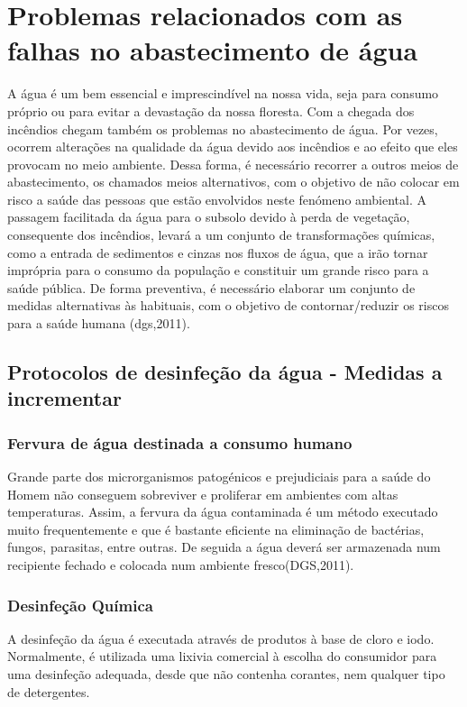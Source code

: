\documentclass{report}
\begin{document}
\section{Problemas relacionados com as falhas no abastecimento de água}
A água é um bem essencial e imprescindível na nossa vida, seja para consumo próprio ou para evitar a devastação da nossa floresta. Com a chegada dos incêndios chegam também os problemas no abastecimento de água. 
Por vezes, ocorrem alterações na qualidade da água devido aos incêndios e ao efeito que eles provocam no meio ambiente. Dessa forma, é necessário recorrer a outros meios de abastecimento, os chamados meios alternativos, com o objetivo de não colocar em risco a saúde das pessoas que estão envolvidos neste fenómeno ambiental. A passagem facilitada da água para o subsolo devido à perda de vegetação, consequente dos incêndios, levará a um conjunto de transformações químicas, como a entrada de sedimentos e cinzas nos fluxos de água, que a irão tornar imprópria para o consumo da população e constituir um grande risco para a saúde pública.
De forma preventiva, é necessário elaborar um conjunto de medidas alternativas às habituais, com o objetivo de contornar/reduzir os riscos para a saúde humana  (\ac{dgs},2011).


\subsection{Protocolos de desinfeção da água - Medidas a incrementar}

\subsubsection{Fervura de água destinada a consumo humano}
\cite{dgsriscos}

Grande parte dos microrganismos patogénicos e prejudiciais para a saúde do Homem não conseguem sobreviver e proliferar em ambientes com altas temperaturas. Assim, a fervura da água contaminada é um método executado muito frequentemente e que é bastante eficiente na eliminação de bactérias, fungos, parasitas, entre outras. De seguida a água deverá ser armazenada num recipiente fechado e colocada num ambiente fresco(DGS,2011).

\subsubsection{Desinfeção Química}
\cite{dgsriscos}

A desinfeção da água é executada através de produtos à base de cloro e iodo. Normalmente, é utilizada uma lixivia comercial à escolha do consumidor para uma desinfeção adequada, desde que não contenha corantes, nem qualquer tipo de detergentes. 
\end{document}
